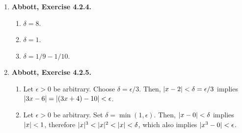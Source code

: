 \documentclass{article}
\DeclarePairedDelimiter\abs{\lvert}{\rvert}
\newcommand{\N}{\mathbb{N}}
\newcommand{\Q}{\mathbb{Q}}
\newcommand{\R}{\mathbb{R}}
\newcommand{\set}[1]{\{#1\}}
\newcommand{\exc}[2][Abbott]{\item \textbf{#1, Exercise #2.}}
\newcommand{\lep}[1][L]{#1et $\epsilon > 0$ be arbitrary}
\begin{document}
\begin{enumerate}
\begin{enumerate}
        \item $\lim(t(x_n)) = \lim(t(y_n)) = \lim(t(z_n)) = 0$.
        
        \item We claim that $\lim_{x \to 1} t(x) = 0$. \lep. If $\epsilon > 1$, then $\abs{t(x)} = t(x) < \epsilon$ for all $x$, so we can set $\delta$ to any positive real number. Otherwise, choose some arbitrary $a \in A = \set{x \in \R : t(x) \geq \epsilon}$. Notice that every $b \in A$ is rational, otherwise we would have $t(b) = 0 < \epsilon$. Assume $a$ is a limit point of $A$. Then, for every $n \in \N$ there is some $x_n \in A$ such that $x_n \in V_{1/n}(a)$ and $x_n \neq a$. Since $x_n \in \Q$, we can write it as $p_n/q_n$ for integers $p_n/q_n$ in the lowest terms, such that $q_n > 0$. Then, Lemma (\ref{lem_rationalAproximations}) guarantees that there is some $N \in \N$ such that $1/q_N < \epsilon$. But, $t(x_N) = t(p_N/q_N) = 1/q_N$ which should be greater than or equal to $\epsilon$, since $x_N \in A$. This contradiction means that $A$ has no limit points, only isolated points.
        
        Notice that $1 \in A$, since $t(1) = t(1/1) = 1 \geq 1$ (recall that we are assuming that $\epsilon \leq 1$). By our previous discussion, $1$ must be an isolated point of $A$. This means that there is some $V_\delta(1)$ which does not intersect $A$, except possibly at $1$. In other words, for every $x \in V_\delta(1)$ (except $x = 1$), we must have $t(x) = \abs*{t(x)-0} < \epsilon$, which we can also write as $t(x) \in V_\epsilon(0)$. By definition 4.2.1B, we can conclude that $\lim_{x \to 1} t(x) = 0$, just as we conjectured.
    \end{enumerate}
    
    \exc{4.2.4}
    \begin{enumerate}
        \item $\delta = 8$.
        \item $\delta = 1$.
        \item $\delta = 1/9-1/10$.
    \end{enumerate}
    
    \exc{4.2.5}
    \begin{enumerate}
        \item \lep. Choose $\delta = \epsilon/3$. Then, $\abs*{x-2} < \delta = \epsilon/3$ implies $\abs*{3x-6} = \abs*{(3x+4) - 10} < \epsilon$.
        
        \item \lep. Set $\delta = \min(1, \epsilon)$. Then, $\abs*{x-0} < \delta$ implies $\abs{x} < 1$, therefore $\abs{x}^3 < \abs{x}^2 < \abs{x} < \delta$, which also implies $\abs{x^3 - 0} < \epsilon$.
        

\end{enumerate}
\end{enumerate}
\end{document}
